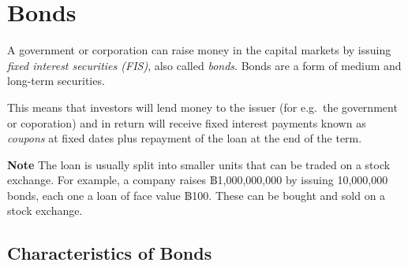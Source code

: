 \documentclass[
]{book}
\theoremstyle{definition}
\theoremstyle{definition}
\theoremstyle{definition}
\theoremstyle{definition}
\theoremstyle{remark}
\begin{document}
\hypertarget{bonds}{%
\section{Bonds}\label{bonds}}

A government or corporation can raise money in the capital markets by
issuing \emph{fixed interest securities (FIS)}, also called \emph{bonds}. Bonds
are a form of medium and long-term securities.

This means that investors will lend money to the issuer (for e.g.~the
government or coporation) and in return will receive fixed interest
payments known as \emph{coupons} at fixed dates plus repayment of the loan at
the end of the term.

\textbf{Note} The loan is usually split into smaller units that can be traded
on a stock exchange. For example, a company raises ฿1,000,000,000 by
issuing 10,000,000 bonds, each one a loan of face value ฿100. These can
be bought and sold on a stock exchange.

\hypertarget{characteristics-of-bonds}{%
\subsection{Characteristics of Bonds}\label{characteristics-of-bonds}}
\end{document}
